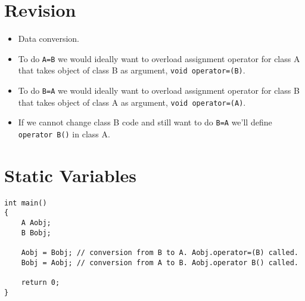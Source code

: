\documentclass[12pt,a4paper]{article}
\begin{document}
\section{Revision}
\begin{itemize}
\item Data conversion.
\item To do \verb|A=B| we would ideally want to overload assignment operator for class A that takes object of class B as argument, \verb|void operator=(B)|.
\item To do \verb|B=A| we would ideally want to overload assignment operator for class B that takes object of class A as argument, \verb|void operator=(A)|.
\item If we cannot change class B code and still want to do \verb|B=A| we'll define \verb|operator B()| in class A.
\end{itemize}
\section{Static Variables}

\begin{lstlisting}[caption={Object Conversion}]
int main()
{
	A Aobj;
	B Bobj;
	
	Aobj = Bobj; // conversion from B to A. Aobj.operator=(B) called.
	Bobj = Aobj; // conversion from A to B. Aobj.operator B() called.

	return 0;
}
\end{lstlisting}


\end{document}

